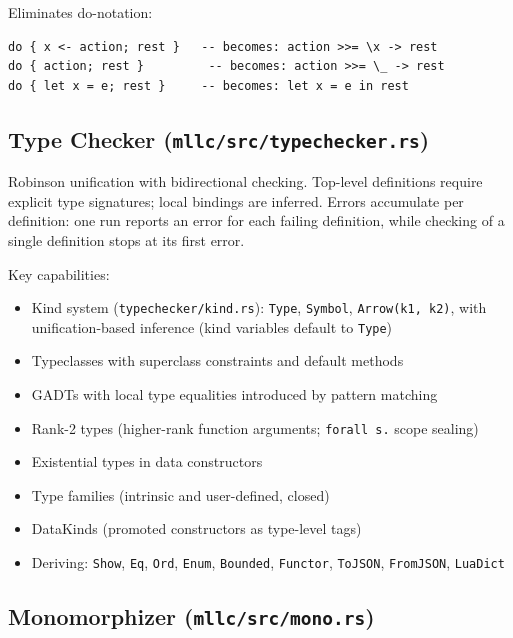 \documentclass[11pt,a4paper]{article}
\begin{document}
Eliminates do-notation:
\begin{lstlisting}[language=MLL]
do { x <- action; rest }   -- becomes: action >>= \x -> rest
do { action; rest }         -- becomes: action >>= \_ -> rest
do { let x = e; rest }     -- becomes: let x = e in rest
\end{lstlisting}

\subsection{Type Checker (\texttt{mllc/src/typechecker.rs})}

Robinson unification with bidirectional checking.  Top-level definitions require
explicit type signatures; local bindings are inferred.  Errors accumulate per
definition: one run reports an error for each failing definition, while
checking of a single definition stops at its first error.

Key capabilities:
\begin{itemize}[nosep]
  \item Kind system (\texttt{typechecker/kind.rs}): \texttt{Type},
        \texttt{Symbol}, \texttt{Arrow(k1, k2)}, with unification-based
        inference (kind variables default to \texttt{Type})
  \item Typeclasses with superclass constraints and default methods
  \item GADTs with local type equalities introduced by pattern matching
  \item Rank-2 types (higher-rank function arguments; \texttt{forall s.}
        scope sealing)
  \item Existential types in data constructors
  \item Type families (intrinsic and user-defined, closed)
  \item DataKinds (promoted constructors as type-level tags)
  \item Deriving: \texttt{Show}, \texttt{Eq}, \texttt{Ord}, \texttt{Enum},
        \texttt{Bounded}, \texttt{Functor}, \texttt{ToJSON}, \texttt{FromJSON},
        \texttt{LuaDict}
\end{itemize}

\subsection{Monomorphizer (\texttt{mllc/src/mono.rs})}
\end{document}
